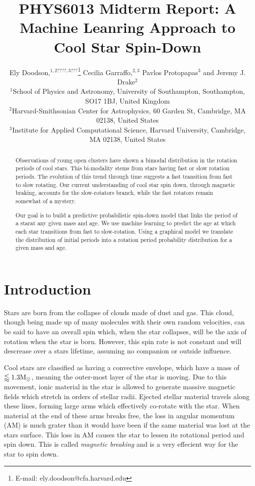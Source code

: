 \documentclass[fleqn,usenatbib]{mnras}
\title{PHYS6013 Midterm Report: A Machine Leanring Approach to Cool Star Spin-Down}
\author[E. Doodson et al.]{
Ely Doodson,$^{1,2????,3???}$\thanks{E-mail: ely.doodson@cfa.harvard.edu}
Cecilia Garraffo,$^{2,3}$
Pavlos Protopapas$^{3}$
and Jeremy J. Drake$^{2}$
\\
$^{1}$School of Physics and Astronomy, University of Southampton,
Southampton, SO17 1BJ, United Kingdom\\
$^{2}$Harvard-Smithsonian Center for Astrophysics, 60 Garden St, Cambridge, MA 02138, United States \\
$^{3}$Institute for Applied Computational Science, Harvard University, Cambridge, MA 02138, United States
}
\begin{document}
\label{firstpage}
\pagerange{\pageref{firstpage}--\pageref{lastpage}}
\maketitle

\begin{abstract}
	Observations of young open clusters have shown a bimodal distribution in the rotation
	periods of cool stars.
	This bi-modality stems from stars having fast or slow rotation periods.
	The evolution of this trend through time suggests a fast transition from fast to slow rotating.
	Our current understanding of cool star spin down, through magnetic braking, accounts for the slow-rotators branch, while the fast rotators remain somewhat of a mystery.

	Our goal is to build a predictive probabilistic spin-down model that links the period of a starat any given mass and age.
	We use machine learning to predict the age at which each star transitions from fast to slow-rotation.
	Using a graphical model we translate the distribution of initial periods into a rotation period probability distribution for a given mass and age.
\end{abstract}


\section{Introduction}
Stars are born from the collapse of clouds made of dust and gas.
This cloud, though being made up of many molecules with their own random velocities, can be said to have an overall spin which, when the star collapses, will be the axis of rotation when the star is born.
However, this spin rate is not constant and will descrease over a stars lifetime, assuming no companion or outside influence.

Cool stars are classified as having a convective envelope, which have a mass of $\lessapprox 1.3 \textup{M}_\odot$, meaning the outer-most layer of the star is moving.
Due to this movement, ionic material in the star is allowed to generate massive magnetic fields which stretch in orders of stellar radii.
Ejected stellar material travels along these lines, forming large arms which effectively co-rotate with the star.
When material at the end of these arms breaks free, the loss in angular momentum (AM) is much grater than it would have been if the same material was lost at the stars surface.
This loss in AM causes the star to lessen its rotational period and spin down.
This is called \textit{magnetic breaking} and is a very effecient way for the star to spin down.
\end{document}

